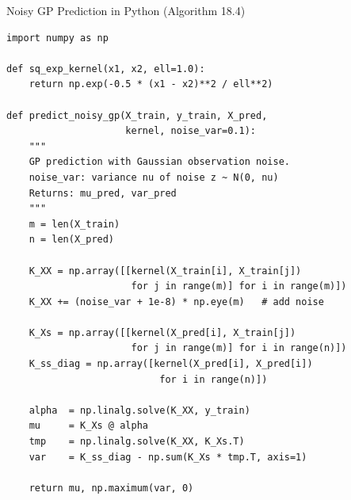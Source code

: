 \documentclass[aspectratio=169,10pt]{beamer}
\begin{document}
\begin{frame}[fragile]{Noisy GP Prediction in Python (Algorithm 18.4)}
\begin{lstlisting}
import numpy as np

def sq_exp_kernel(x1, x2, ell=1.0):
    return np.exp(-0.5 * (x1 - x2)**2 / ell**2)

def predict_noisy_gp(X_train, y_train, X_pred,
                     kernel, noise_var=0.1):
    """
    GP prediction with Gaussian observation noise.
    noise_var: variance nu of noise z ~ N(0, nu)
    Returns: mu_pred, var_pred
    """
    m = len(X_train)
    n = len(X_pred)

    K_XX = np.array([[kernel(X_train[i], X_train[j])
                      for j in range(m)] for i in range(m)])
    K_XX += (noise_var + 1e-8) * np.eye(m)   # add noise

    K_Xs = np.array([[kernel(X_pred[i], X_train[j])
                      for j in range(m)] for i in range(n)])
    K_ss_diag = np.array([kernel(X_pred[i], X_pred[i])
                           for i in range(n)])

    alpha  = np.linalg.solve(K_XX, y_train)
    mu     = K_Xs @ alpha
    tmp    = np.linalg.solve(K_XX, K_Xs.T)
    var    = K_ss_diag - np.sum(K_Xs * tmp.T, axis=1)

    return mu, np.maximum(var, 0)
\end{lstlisting}
\end{frame}
\end{document}
